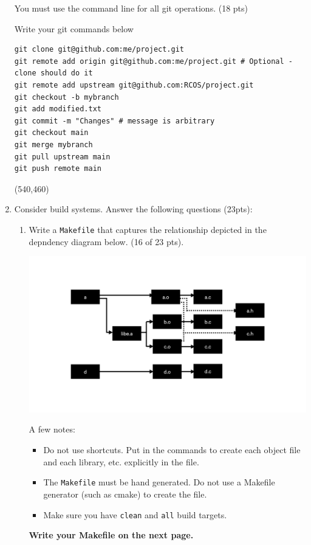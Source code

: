\documentclass[10pt]{article}
\begin{document}
\begin{enumerate}
You must use the command line for all git operations. (18 pts)

Write your git commands below

\beginanswers
\begin{lstlisting}
git clone git@github.com:me/project.git
git remote add origin git@github.com:me/project.git # Optional - clone should do it
git remote add upstream git@github.com:RCOS/project.git
git checkout -b mybranch
git add modified.txt
git commit -m "Changes" # message is arbitrary
git checkout main
git merge mybranch
git pull upstream main
git push remote main
\end{lstlisting}
\else
\hspace*{-0.4in}\framebox(540,460){}
\fi
\newpage

\item Consider build systems. Answer the following questions (23pts):

\begin{enumerate}
\item Write a \verb*|Makefile| that captures the relationship depicted in the depndency diagram below.  (16 of 23 pts).

\centerline{
	\includegraphics[width=7.5in]{dependency}
}
A few notes:
\begin{itemize}
	\item Do not use shortcuts. Put in the commands to create each object file and each library, etc. explicitly in the file.
	\item The \verb*|Makefile| must be hand generated. Do not use a Makefile generator (such as cmake) to create the file.
	\item Make sure you have \verb*|clean| and \verb|all| build targets.
\end{itemize}

\begin{center}
\LARGE\textbf{Write your Makefile on the next page.}
\end{center}


\end{enumerate}
\end{enumerate}
\end{document}
